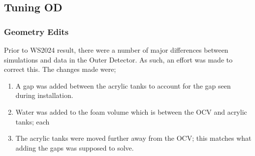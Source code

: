 \subsection{Tuning OD}
\subsubsection{Geometry Edits}\label{sec:GeometryEdits}
Prior to WS2024 result, there were a number of major differences between simulations and data in the Outer Detector.
As such, an effort was made to correct this.
The changes made were;
\begin{enumerate}
	\item A gap was added between the acrylic tanks to account for the gap seen during installation.
	\item Water was added to the foam volume which is between the OCV and acrylic tanks; each
	\item The acrylic tanks were moved further away from the OCV; this matches what adding the gaps was supposed to solve.
\end{enumerate}

